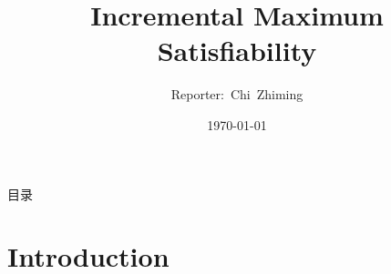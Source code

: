 \documentclass[aspectratio=169 %
,serif,mathserif]{beamer}
\begin{document}
\title{Incremental Maximum Satisfiability} %
\author[Chi~Zhiming]{Reporter:~Chi~Zhiming} %
\institute[ISCAS] %
{	
}
	\CTEXoptions[today=old]
	\date{\today} %
\begin{frame}[plain]\vspace{1.5em}
\titlepage\vspace{-0.5cm}
\end{frame}
\begin{frame}{目录}
\tableofcontents
\end{frame}

\section{Introduction} %
\end{document}
